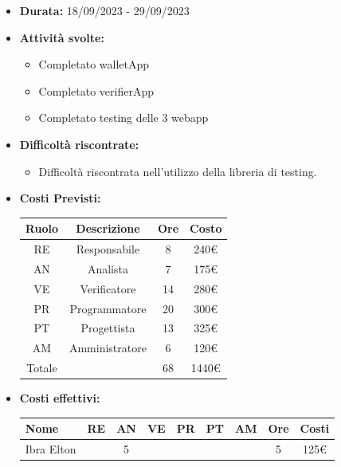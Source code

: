         \begin{itemize}
            \item \textbf{Durata:} 18/09/2023 - 29/09/2023 
            \item \textbf{Attività svolte:}
            \begin{itemize}
                \item Completato walletApp
                \item Completato verifierApp
                \item Completato testing delle 3 webapp 
                
            \end{itemize}
            \item \textbf{Difficoltà riscontrate:}
            \begin{itemize}
                \item Difficoltà riscontrata nell'utilizzo della libreria di testing. 
            \end{itemize}
            \item \textbf{Costi Previsti:}
            \begin{longtable}{|c|c|c|c|}
                \hline
                Ruolo & Descrizione & Ore & Costo \\
                \hline
                RE & Responsabile & 8 & 240€\\
                \hline
                AN & Analista & 7 &  175€\\
                \hline
                VE & Verificatore & 14 & 280€ \\
                \hline
                PR & Programmatore & 20 &  300€\\
                \hline
                PT & Progettista & 13 & 325€ \\
                \hline
                AM & Amministratore & 6 & 120€ \\
                \hline
                Totale & & 68 & 1440€ \\
                \hline
                \end{longtable}
            \item \textbf{Costi effettivi:}
            \begin{longtable}{|p{}|c|c|c|c|c|c|c|c|}
                \hline
                Nome & RE & AN & VE & PR & PT & AM & Ore & Costi\\
                \hline
                Ibra \newline Elton & &5 & & & & &5 &125€ \\

\end{longtable}
\end{itemize}
